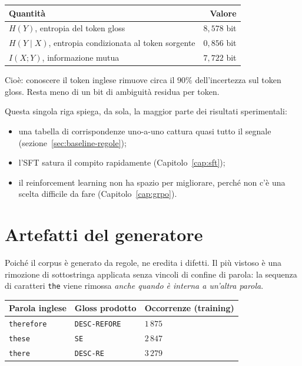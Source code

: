 \begin{center}
\begin{tabular}{lr}
\toprule
Quantità & Valore \\
\midrule
$H(Y)$, entropia del token gloss & $8{,}578$ bit \\
$H(Y \mid X)$, entropia condizionata al token sorgente & $0{,}856$ bit \\
$I(X;Y)$, informazione mutua & $7{,}722$ bit \\
\bottomrule
\end{tabular}
\end{center}

Cioè: conoscere il token inglese rimuove circa il $90\%$ dell'incertezza sul
token gloss. Resta meno di un bit di ambiguità residua per token.

Questa singola riga spiega, da sola, la maggior parte dei risultati
sperimentali:
\begin{itemize}
  \item una tabella di corrispondenze uno-a-uno cattura quasi tutto il segnale
        (sezione~\ref{sec:baseline-regole});
  \item l'SFT satura il compito rapidamente (Capitolo~\ref{cap:sft});
  \item il reinforcement learning non ha spazio per migliorare, perché non c'è
        una scelta difficile da fare (Capitolo~\ref{cap:grpo}).
\end{itemize}

\section{Artefatti del generatore}
\label{sec:artefatti}

Poiché il corpus è generato da regole, ne eredita i difetti. Il più vistoso è
una rimozione di sottostringa applicata senza vincoli di confine di parola: la
sequenza di caratteri \texttt{the} viene rimossa \emph{anche quando è interna a
un'altra parola}.

\begin{center}
\begin{tabular}{lll}
\toprule
Parola inglese & Gloss prodotto & Occorrenze (training) \\
\midrule
\texttt{therefore} & \texttt{DESC-REFORE} & $1\,875$ \\
\texttt{these}     & \texttt{SE}          & $2\,847$ \\
\texttt{there}     & \texttt{DESC-RE}     & $3\,279$ \\
\bottomrule
\end{tabular}
\end{center}

